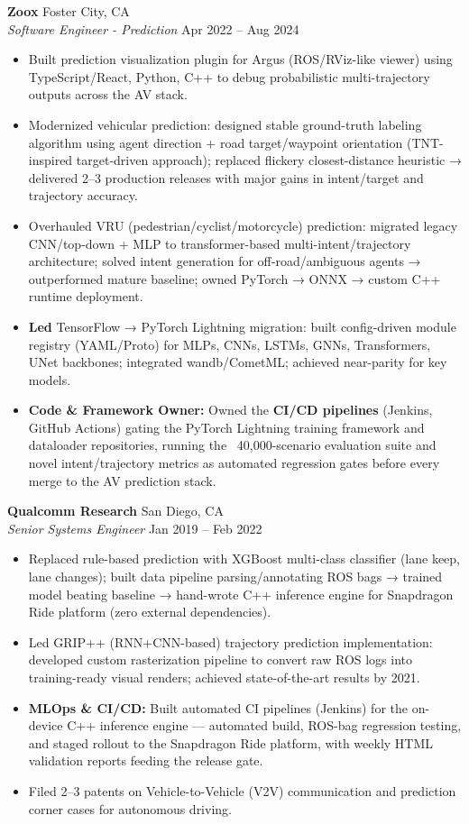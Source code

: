\documentclass[10pt,letterpaper]{article}
\begin{document}
\textbf{Zoox} \hfill Foster City, CA \\
\textit{Software Engineer - Prediction} \hfill Apr 2022 -- Aug 2024
\begin{itemize}
    \item Built prediction visualization plugin for Argus (ROS/RViz-like viewer) using TypeScript/React, Python, C++ to debug probabilistic multi-trajectory outputs across the AV stack.
    \item Modernized vehicular prediction: designed stable ground-truth labeling algorithm using agent direction + road target/waypoint orientation (TNT-inspired target-driven approach); replaced flickery closest-distance heuristic → delivered 2--3 production releases with major gains in intent/target and trajectory accuracy.
    \item Overhauled VRU (pedestrian/cyclist/motorcycle) prediction: migrated legacy CNN/top-down + MLP to transformer-based multi-intent/trajectory architecture; solved intent generation for off-road/ambiguous agents → outperformed mature baseline; owned PyTorch → ONNX → custom C++ runtime deployment.
    \item \textbf{Led} TensorFlow → PyTorch Lightning migration: built config-driven module registry (YAML/Proto) for MLPs, CNNs, LSTMs, GNNs, Transformers, UNet backbones; integrated wandb/CometML; achieved near-parity for key models.
    \item \textbf{Code \& Framework Owner:} Owned the \textbf{CI/CD pipelines} (Jenkins, GitHub Actions) gating the PyTorch Lightning training framework and dataloader repositories, running the ~40,000-scenario evaluation suite and novel intent/trajectory metrics as automated regression gates before every merge to the AV prediction stack.
\end{itemize}

\textbf{Qualcomm Research} \hfill San Diego, CA \\
\textit{Senior Systems Engineer} \hfill Jan 2019 -- Feb 2022
\begin{itemize}
    \item Replaced rule-based prediction with XGBoost multi-class classifier (lane keep, lane changes); built data pipeline parsing/annotating ROS bags → trained model beating baseline → hand-wrote C++ inference engine for Snapdragon Ride platform (zero external dependencies).
    \item Led GRIP++ (RNN+CNN-based) trajectory prediction implementation: developed custom rasterization pipeline to convert raw ROS logs into training-ready visual renders; achieved state-of-the-art results by 2021.
    \item \textbf{MLOps \& CI/CD:} Built automated CI pipelines (Jenkins) for the on-device C++ inference engine — automated build, ROS-bag regression testing, and staged rollout to the Snapdragon Ride platform, with weekly HTML validation reports feeding the release gate.
    \item Filed 2--3 patents on Vehicle-to-Vehicle (V2V) communication and prediction corner cases for autonomous driving.
\end{itemize}
\end{document}
